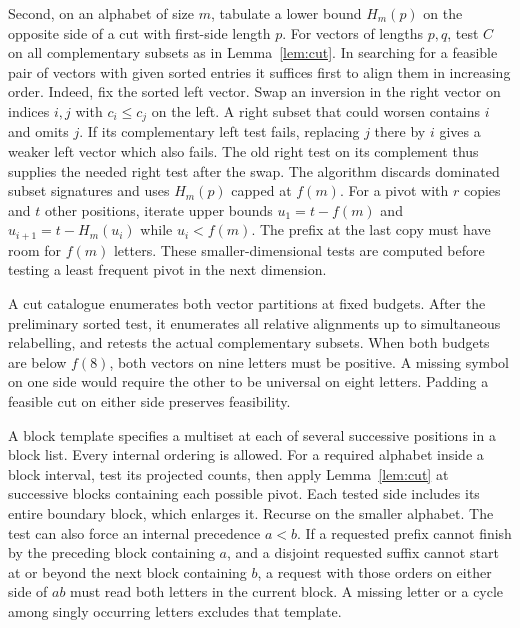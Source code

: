 \documentclass[11pt]{article}
\begin{document}
Second, on an alphabet of size $m$, tabulate a lower bound $H_m(p)$ on the opposite side of a cut with first-side length $p$. For vectors of lengths $p,q$, test $C$ on all complementary subsets as in Lemma~\ref{lem:cut}. In searching for a feasible pair of vectors with given sorted entries it suffices first to align them in increasing order. Indeed, fix the sorted left vector. Swap an inversion in the right vector on indices $i,j$ with $c_i\le c_j$ on the left. A right subset that could worsen contains $i$ and omits $j$. If its complementary left test fails, replacing $j$ there by $i$ gives a weaker left vector which also fails. The old right test on its complement thus supplies the needed right test after the swap. The algorithm discards dominated subset signatures and uses $H_m(p)$ capped at $f(m)$. For a pivot with $r$ copies and $t$ other positions, iterate upper bounds $u_1=t-f(m)$ and $u_{i+1}=t-H_m(u_i)$ while $u_i<f(m)$. The prefix at the last copy must have room for $f(m)$ letters. These smaller-dimensional tests are computed before testing a least frequent pivot in the next dimension.

A cut catalogue enumerates both vector partitions at fixed budgets. After the preliminary sorted test, it enumerates all relative alignments up to simultaneous relabelling, and retests the actual complementary subsets. When both budgets are below $f(8)$, both vectors on nine letters must be positive. A missing symbol on one side would require the other to be universal on eight letters. Padding a feasible cut on either side preserves feasibility.

A block template specifies a multiset at each of several successive positions in a block list. Every internal ordering is allowed. For a required alphabet inside a block interval, test its projected counts, then apply Lemma~\ref{lem:cut} at successive blocks containing each possible pivot. Each tested side includes its entire boundary block, which enlarges it. Recurse on the smaller alphabet. The test can also force an internal precedence $a<b$. If a requested prefix cannot finish by the preceding block containing $a$, and a disjoint requested suffix cannot start at or beyond the next block containing $b$, a request with those orders on either side of $ab$ must read both letters in the current block. A missing letter or a cycle among singly occurring letters excludes that template.
\end{document}

